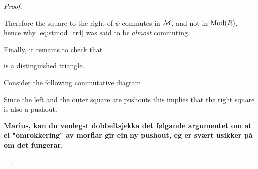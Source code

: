 \begin{proof}
\begin{enumerate}[label={(\bfseries TR\arabic*)}]
{            Therefore the square to the right of \( \psi \) commutes in \( {\mathcal{M}} \), and not in \( \operatorname{Mod}(R) \), hence why \autoref{eq:stmod_tr4} was said to be \emph{almost} commuting.

            Finally, it remains to check that
            \begin{center}
            \end{center}
            is a distinguished triangle.

            Consider the following commutative diagram
            \begin{center}
            \end{center}
            Since the left and the outer square are pushouts this implies that the right square is also a pushout.

            {\bf Marius, kan du venlegst dobbeltsjekka det følgande argumentet om at ei "omrokkering" av morfiar gir ein ny pushout, eg er svært usikker på om det fungerar.}

}
\end{enumerate}
\end{proof}
